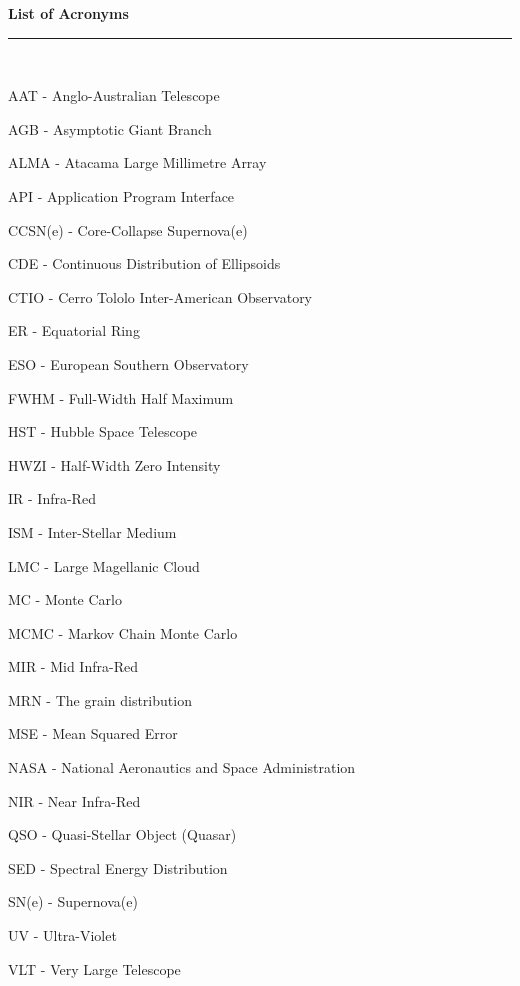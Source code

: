 \thispagestyle{empty}
\begin{raggedleft}
\vspace*{23mm}
\hfill {\huge {\bf {List of Acronyms}}} \\
\vspace{6mm}
\hfill \rule{4in}{.015in} \\
\vspace{19mm}
\end{raggedleft}




%
%

AAT - Anglo-Australian Telescope

AGB - Asymptotic Giant Branch

ALMA - Atacama Large Millimetre Array

API - Application Program Interface

CCSN(e) - Core-Collapse Supernova(e)

CDE - Continuous Distribution of Ellipsoids

CTIO - Cerro Tololo Inter-American Observatory

ER - Equatorial Ring

ESO - European Southern Observatory

FWHM - Full-Width Half Maximum

HST - Hubble Space Telescope

HWZI - Half-Width Zero Intensity

IR - Infra-Red

ISM - Inter-Stellar Medium

LMC - Large Magellanic Cloud

MC - Monte Carlo

MCMC - Markov Chain Monte Carlo

MIR - Mid Infra-Red 

MRN - The \citet*{Mathis1977} grain distribution

MSE - Mean Squared Error

NASA - National Aeronautics and Space Administration

NIR - Near Infra-Red

QSO - Quasi-Stellar Object (Quasar)

SED - Spectral Energy Distribution

SN(e) - Supernova(e)

UV - Ultra-Violet

VLT - Very Large Telescope
